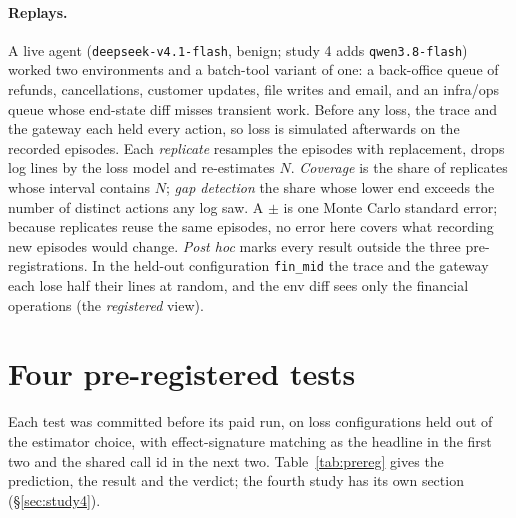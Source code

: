 \documentclass[11pt]{article}
\begin{document}
\paragraph{Replays.} A live agent (\texttt{deepseek-v4.1-flash}, benign; study 4 adds
\texttt{qwen3.8-flash}) worked two
environments and a batch-tool variant of one: a back-office queue of refunds,
cancellations, customer updates, file writes and email, and an infra/ops queue whose
end-state diff misses transient work. Before any loss, the trace and the gateway each held
every action, so loss is simulated afterwards on the recorded episodes. Each
\emph{replicate} resamples the episodes with replacement, drops log lines by the loss
model and re-estimates $N$. \emph{Coverage} is the share of replicates whose interval
contains $N$; \emph{gap detection} the share whose lower end exceeds the number of distinct
actions any log saw. A $\pm$ is one Monte Carlo standard error; because replicates reuse
the same episodes, no error here covers what recording new episodes would change.
\emph{Post hoc} marks every result outside the three pre-registrations. In the held-out
configuration \texttt{fin\_mid} the trace and the gateway each lose half their lines at
random, and the env diff sees only the financial operations (the \emph{registered} view).

\section{Four pre-registered tests}
\label{sec:prereg}

Each test was committed before its paid run, on loss configurations held out of the
estimator choice, with effect-signature matching as the headline in the first two and the
shared call id in the next two. Table~\ref{tab:prereg} gives the prediction, the result and
the verdict; the fourth study has its own section (\S\ref{sec:study4}).
\end{document}
